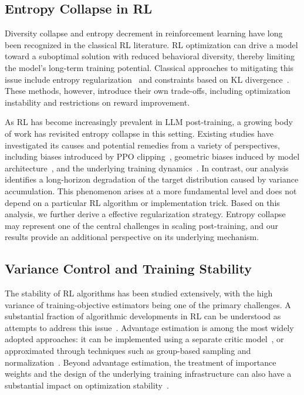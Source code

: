 \subsection{Entropy Collapse in RL}

Diversity collapse and entropy decrement in reinforcement learning have long been recognized in the classical RL literature. RL optimization can drive a model toward a suboptimal solution with reduced behavioral diversity, thereby limiting the model's long-term training potential. Classical approaches to mitigating this issue include entropy regularization~\citep{ahmed_understanding_2019} and constraints based on KL divergence~\citep{schulman_trust_2017}. These methods, however, introduce their own trade-offs, including optimization instability and restrictions on reward improvement.

As RL has become increasingly prevalent in LLM post-training, a growing body of work has revisited entropy collapse in this setting. Existing studies have investigated its causes and potential remedies from a variety of perspectives, including biases introduced by PPO clipping~\citep{yu_dapo_2025, cai_beyond_2026, jin_revisiting_2026}, geometric biases induced by model architecture~\citep{ren_learning_2025}, and the underlying training dynamics~\citep{wang_entropy_2026}. In contrast, our analysis identifies a long-horizon degradation of the target distribution caused by variance accumulation. This phenomenon arises at a more fundamental level and does not depend on a particular RL algorithm or implementation trick. Based on this analysis, we further derive a effective regularization strategy. Entropy collapse may represent one of the central challenges in scaling post-training, and our results provide an additional perspective on its underlying mechanism.

\subsection{Variance Control and Training Stability}

The stability of RL algorithms has been studied extensively, with the high variance of training-objective estimators being one of the primary challenges. A substantial fraction of algorithmic developments in RL can be understood as attempts to address this issue~\citep{konda_onactor-critic_2003, schulman_trust_2017, schulman_proximal_2017}. Advantage estimation is among the most widely adopted approaches: it can be implemented using a separate critic model~\citep{konda_onactor-critic_2003, schulman_trust_2017, schulman_proximal_2017}, or approximated through techniques such as group-based sampling and normalization~\citep{shao_deepseekmath_2024, ahmadian_back_2024}. Beyond advantage estimation, the treatment of importance weights and the design of the underlying training infrastructure can also have a substantial impact on optimization stability~\citep{zheng_group_2025, gao_soft_2025}.

